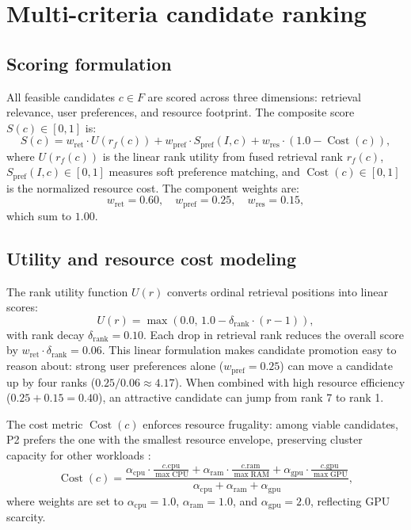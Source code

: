\section{Multi-criteria candidate ranking}

\subsection{Scoring formulation}

All feasible candidates $c \in F$ are scored across three dimensions: retrieval relevance, user preferences, and resource footprint. The composite score $S(c) \in [0, 1]$ is:
\[
S(c) = w_{\mathrm{ret}} \cdot U(r_f(c)) + w_{\mathrm{pref}} \cdot S_{\mathrm{pref}}(I, c) + w_{\mathrm{res}} \cdot (1.0 - \operatorname{Cost}(c)),
\]
where $U(r_f(c))$ is the linear rank utility from fused retrieval rank $r_f(c)$, $S_{\mathrm{pref}}(I, c) \in [0, 1]$ measures soft preference matching, and $\operatorname{Cost}(c) \in [0, 1]$ is the normalized resource cost. The component weights are:
\[
w_{\mathrm{ret}} = 0.60, \quad w_{\mathrm{pref}} = 0.25, \quad w_{\mathrm{res}} = 0.15,
\]
which sum to $1.00$.

\subsection{Utility and resource cost modeling}

The rank utility function $U(r)$ converts ordinal retrieval positions into linear scores:
\[
U(r) = \max\left(0.0, \, 1.0 - \delta_{\mathrm{rank}} \cdot (r - 1)\right),
\]
with rank decay $\delta_{\mathrm{rank}} = 0.10$. Each drop in retrieval rank reduces the overall score by $w_{\mathrm{ret}} \cdot \delta_{\mathrm{rank}} = 0.06$. This linear formulation makes candidate promotion easy to reason about: strong user preferences alone ($w_{\mathrm{pref}} = 0.25$) can move a candidate up by four ranks ($0.25 / 0.06 \approx 4.17$). When combined with high resource efficiency ($0.25 + 0.15 = 0.40$), an attractive candidate can jump from rank 7 to rank 1.

The cost metric $\operatorname{Cost}(c)$ enforces resource frugality: among viable candidates, P2 prefers the one with the smallest resource envelope, preserving cluster capacity for other workloads \cite{k8sresources,resourcecentral}:
\[
\operatorname{Cost}(c) = \frac{\alpha_{\mathrm{cpu}} \cdot \frac{c.\mathrm{cpu}}{\max \mathrm{CPU}} + \alpha_{\mathrm{ram}} \cdot \frac{c.\mathrm{ram}}{\max \mathrm{RAM}} + \alpha_{\mathrm{gpu}} \cdot \frac{c.\mathrm{gpu}}{\max \mathrm{GPU}}}{\alpha_{\mathrm{cpu}} + \alpha_{\mathrm{ram}} + \alpha_{\mathrm{gpu}}},
\]
where weights are set to $\alpha_{\mathrm{cpu}} = 1.0$, $\alpha_{\mathrm{ram}} = 1.0$, and $\alpha_{\mathrm{gpu}} = 2.0$, reflecting GPU scarcity.

